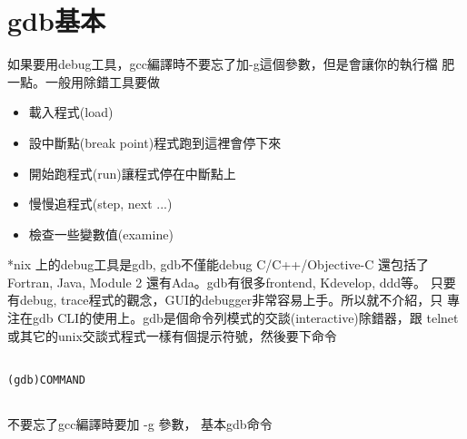 \section{gdb基本}
如果要用debug工具，gcc編譯時不要忘了加-g這個參數，但是會讓你的執行檔
肥一點。一般用除錯工具要做
\begin{itemize}
  \item 載入程式(load)
  \item 設中斷點(break point)程式跑到這裡會停下來
  \item 開始跑程式(run)讓程式停在中斷點上
  \item 慢慢追程式(step, next ...)
  \item 檢查一些變數值(examine)
\end{itemize}
*nix 上的debug工具是gdb, gdb不僅能debug C/C++/Objective-C
還包括了Fortran, Java, Module 2 還有Ada。gdb有很多frontend, Kdevelop, ddd等。
只要有debug, trace程式的觀念，GUI的debugger非常容易上手。所以就不介紹，只
專注在gdb CLI的使用上。gdb是個命令列模式的交談(interactive)除錯器，跟
telnet或其它的unix交談式程式一樣有個提示符號，然後要下命令
  \begin{verbatim}
      
(gdb)COMMAND
      
  \end{verbatim}
  不要忘了gcc編譯時要加 -g 參數， 基本gdb命令
